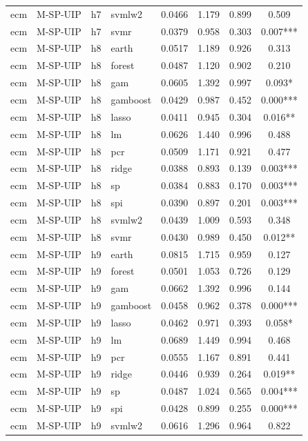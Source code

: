 \begin{ThreePartTable}
\begin{longtable}[t]{llclcccc}
ecm & M-SP-UIP & h7 & svmlw2 & 0.0466 & 1.179 & 0.899 & 0.509\\
ecm & M-SP-UIP & h7 & svmr & 0.0379 & 0.958 & 0.303 & 0.007***\\
\addlinespace
ecm & M-SP-UIP & h8 & earth & 0.0517 & 1.189 & 0.926 & 0.313\\
ecm & M-SP-UIP & h8 & forest & 0.0487 & 1.120 & 0.902 & 0.210\\
ecm & M-SP-UIP & h8 & gam & 0.0605 & 1.392 & 0.997 & 0.093*\\
ecm & M-SP-UIP & h8 & gamboost & 0.0429 & 0.987 & 0.452 & 0.000***\\
ecm & M-SP-UIP & h8 & lasso & 0.0411 & 0.945 & 0.304 & 0.016**\\
ecm & M-SP-UIP & h8 & lm & 0.0626 & 1.440 & 0.996 & 0.488\\
ecm & M-SP-UIP & h8 & pcr & 0.0509 & 1.171 & 0.921 & 0.477\\
ecm & M-SP-UIP & h8 & ridge & 0.0388 & 0.893 & 0.139 & 0.003***\\
ecm & M-SP-UIP & h8 & sp & 0.0384 & 0.883 & 0.170 & 0.003***\\
ecm & M-SP-UIP & h8 & spi & 0.0390 & 0.897 & 0.201 & 0.003***\\
ecm & M-SP-UIP & h8 & svmlw2 & 0.0439 & 1.009 & 0.593 & 0.348\\
ecm & M-SP-UIP & h8 & svmr & 0.0430 & 0.989 & 0.450 & 0.012**\\
\addlinespace
ecm & M-SP-UIP & h9 & earth & 0.0815 & 1.715 & 0.959 & 0.127\\
ecm & M-SP-UIP & h9 & forest & 0.0501 & 1.053 & 0.726 & 0.129\\
ecm & M-SP-UIP & h9 & gam & 0.0662 & 1.392 & 0.996 & 0.144\\
ecm & M-SP-UIP & h9 & gamboost & 0.0458 & 0.962 & 0.378 & 0.000***\\
ecm & M-SP-UIP & h9 & lasso & 0.0462 & 0.971 & 0.393 & 0.058*\\
ecm & M-SP-UIP & h9 & lm & 0.0689 & 1.449 & 0.994 & 0.468\\
ecm & M-SP-UIP & h9 & pcr & 0.0555 & 1.167 & 0.891 & 0.441\\
ecm & M-SP-UIP & h9 & ridge & 0.0446 & 0.939 & 0.264 & 0.019**\\
ecm & M-SP-UIP & h9 & sp & 0.0487 & 1.024 & 0.565 & 0.004***\\
ecm & M-SP-UIP & h9 & spi & 0.0428 & 0.899 & 0.255 & 0.000***\\
ecm & M-SP-UIP & h9 & svmlw2 & 0.0616 & 1.296 & 0.964 & 0.822\\

\end{longtable}
\end{ThreePartTable}
